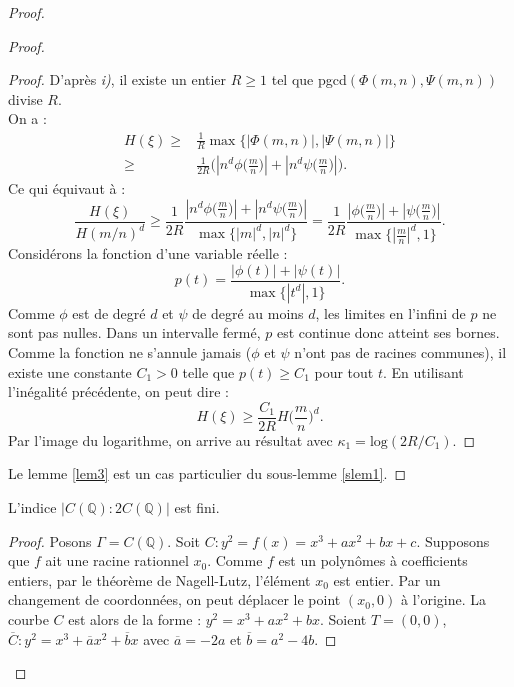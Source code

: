 \documentclass[a4paper]{article}
\begin{document}
\begin{proof}
\begin{proof}
\begin{proof}
\noindent D'après \textit{i)}, il existe un entier $R \geqslant 1$ tel que pgcd$(\Phi(m,n),\Psi(m,n))$ divise $R$. \\
On a : 
\begin{align*}
H(\xi) \geqslant& \frac{1}{R} \max\{| \Phi(m,n) |,\mid \Psi(m,n)| \} \\
\geqslant& \frac{1}{2R} \Big( | n^d\phi\Big(\frac{m}{n}\Big) |+| n^d\psi\Big(\frac{m}{n}\Big)| \Big).
\end{align*}
Ce qui équivaut à :
\begin{equation*}
\frac{H(\xi)}{H(m/n)^d} \geqslant \frac{1}{2R} \frac{| n^d\phi\Big(\frac{m}{n}\Big) |+| n^d\psi\Big(\frac{m}{n}\Big)|}{\max \{ | m |^d,| n |^d \} } 
= \frac{1}{2R} \frac{| \phi\Big(\frac{m}{n}\Big) |+| \psi\Big(\frac{m}{n}\Big)|}{\max \{ | \frac{m}{n} |^d,1 \}}.
\end{equation*}
Considérons la fonction d'une variable réelle :
\begin{equation*}
p(t)= \frac{| \phi(t) |+| \psi(t) |}{\max \{ |t^d|,1 \}}.
\end{equation*}
Comme $\phi$ est de degré $d$ et $\psi$ de degré au moins $d$, les limites en l'infini de $p$ ne sont pas nulles. Dans un intervalle fermé, $p$ est continue donc atteint ses bornes. Comme la fonction ne s'annule jamais ($\phi$ et $\psi$ n'ont pas de racines communes), il existe une constante $C_{1} > 0$ telle que $p(t) \geqslant C_{1}$ pour tout $t$.
En utilisant l'inégalité précédente, on peut dire :
\begin{equation*}
H(\xi)\geqslant \frac{C_{1}}{2R} H \Big( \frac{m}{n} \Big)^d.
\end{equation*}
Par l'image du logarithme, on arrive au résultat avec $\kappa_{1}=\text{log}(2R/C_{1})$.
\end{proof}
Le lemme \ref{lem3} est un cas particulier du sous-lemme \ref{slem1}.
\end{proof}

\begin{lem} \label{lem4}
L'indice $|C(\mathbb{Q}):2C(\mathbb{Q})|$ est fini.
\end{lem}
\begin{proof}
Posons $\Gamma=C(\mathbb{Q})$.
Soit $C : y^2=f(x)=x^3+ax^2+bx+c$. Supposons que $f$ ait une racine rationnel $x_{0}$. Comme $f$ est un polynômes à coefficients entiers, par le théorème de Nagell-Lutz, l'élément $x_{0}$ est entier. Par un changement de coordonnées, on peut déplacer le point $(x_{0},0)$ à l'origine.
La courbe $C$ est alors de la forme : $y^2=x^3+ax^2+bx$.
Soient $T=(0,0)$, $\overline{C}: y^2=x^3+\overline{a}x^2+\overline{b}x$ avec $\overline{a}=-2a$ et $\overline{b}=a^2-4b$. 


\end{proof}
\end{proof}
\end{document}

